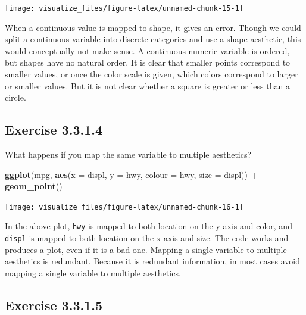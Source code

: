 \documentclass[]{book}
\newenvironment{Shaded}{\begin{snugshade}}{\end{snugshade}}
\newcommand{\DataTypeTok}[1]{\textcolor[rgb]{0.13,0.29,0.53}{#1}}
\newcommand{\KeywordTok}[1]{\textcolor[rgb]{0.13,0.29,0.53}{\textbf{#1}}}
\newcommand{\NormalTok}[1]{#1}
\newcommand{\OperatorTok}[1]{\textcolor[rgb]{0.81,0.36,0.00}{\textbf{#1}}}
\newcommand{\StringTok}[1]{\textcolor[rgb]{0.31,0.60,0.02}{#1}}
\theoremstyle{plain}
\theoremstyle{remark}
\begin{document}
\begin{center}\texttt{[image: visualize\_files/figure-latex/unnamed-chunk-15-1]} \end{center}

When a continuous value is mapped to shape, it gives an error.
Though we could split a continuous variable into discrete categories and use a shape aesthetic, this would conceptually not make sense.
A continuous numeric variable is ordered, but shapes have no natural order.
It is clear that smaller points correspond to smaller values, or once the color scale is given, which colors correspond to larger or smaller values. But it is not clear whether a square is greater or less than a circle.

\hypertarget{exercise-3.3.1.4}{%
\subsection*{\texorpdfstring{Exercise {3.3.1.4}}{Exercise 3.3.1.4}}\label{exercise-3.3.1.4}}

What happens if you map the same variable to multiple aesthetics?

\begin{Shaded}
\begin{Highlighting}[]
\KeywordTok{ggplot}\NormalTok{(mpg, }\KeywordTok{aes}\NormalTok{(}\DataTypeTok{x =}\NormalTok{ displ, }\DataTypeTok{y =}\NormalTok{ hwy, }\DataTypeTok{colour =}\NormalTok{ hwy, }\DataTypeTok{size =}\NormalTok{ displ)) }\OperatorTok{+}
\StringTok{  }\KeywordTok{geom_point}\NormalTok{()}
\end{Highlighting}
\end{Shaded}

\begin{center}\texttt{[image: visualize\_files/figure-latex/unnamed-chunk-16-1]} \end{center}

In the above plot, \texttt{hwy} is mapped to both location on the y-axis and color, and \texttt{displ} is mapped to both location on the x-axis and size.
The code works and produces a plot, even if it is a bad one.
Mapping a single variable to multiple aesthetics is redundant.
Because it is redundant information, in most cases avoid mapping a single variable to multiple aesthetics.

\hypertarget{exercise-3.3.1.5}{%
\subsection*{\texorpdfstring{Exercise {3.3.1.5}}{Exercise 3.3.1.5}}\label{exercise-3.3.1.5}}
\end{document}

